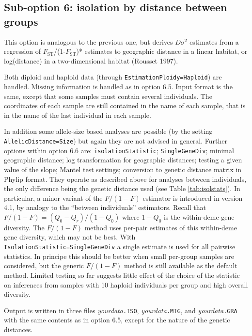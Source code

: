 \documentclass[
  12pt,
]{book}
\begin{document}
\hypertarget{sub-option-6-isolation-by-distance-between-groups}{%
\subsection{Sub-option 6: isolation by distance between groups}\label{sub-option-6-isolation-by-distance-between-groups}}

This option is analogous to the previous one, but derives \(D\sigma^2\) estimates from a regression of
\(F_{\mathrm{ST}}\)/(1-\(F_{\mathrm{ST}}\))* estimates to geographic distance in a linear habitat, or log(distance) in a two-dimensional habitat (Rousset 1997).

Both diploid and haploid data (through \texttt{EstimationPloidy=Haploid}) are handled. Missing information is handled as in option 6.5. Input format is the same, except that some samples must contain several individuals. The coordinates of each sample are still contained in the name of each sample, that is in the name of the last individual in each sample.

In addition some allele-size based analyses are possible (by the setting \texttt{AllelicDistance=Size}) but again they are not advised in general. Further options within option 6.6 are: \texttt{isolationStatistic}; \texttt{SingleGeneDiv}; minimal geographic distance; log transformation for geographic distances; testing a given value of the slope; Mantel test settings; conversion to genetic distance matrix in Phylip format. They operate as described above for analyses between individuals, the only difference being the genetic distance used (see Table \ref{tab:isolstats}). In particular, a minor variant of the \(F/(1-F)\) estimator is introduced in version 4.1, by analogy to the ``between individuals'' estimators. Recall that \(F/(1-F)=(Q_0-Q_r)/(1-Q_0)\) where \(1-Q_0\) is the within-deme gene diversity. The \(F/(1-F)\) method uses per-pair estimates of this within-deme gene diversity, which may not be best. With \texttt{IsolationStatistic=SingleGeneDiv} a single estimate is used for all pairwise statistics. In principe this should be better when small per-group samples are considered, but the generic \(F/(1-F)\) method is still available as the default method. Limited testing so far suggests little effect of the choice of the statistic on inferences from samples with 10 haploid individuals per group and high overall diversity.

Output is written in three files \emph{yourdata}\texttt{.ISO}, \emph{yourdata}\texttt{.MIG}, and \emph{yourdata}\texttt{.GRA} with the same contents as in option 6.5, except for the nature of the genetic distances.
\end{document}
